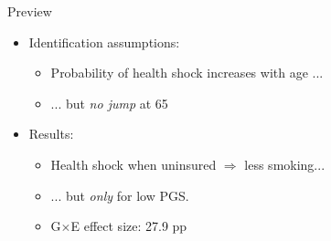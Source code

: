 \documentclass[10pt,compress,xcolor=dvipsnames,aspectratio=169]{beamer}    %
\newcounter{ex}
\newcommand{\1}[1]{\mathrm{1\hspace*{-2.5pt}l}[#1]}	%
\begin{document}
\begin{frame}{Preview}

\begin{itemize}
	\item Identification assumptions:
	\begin{itemize}
		\item Probability of health shock increases with age ...
		\item ... but \emph{no jump} at 65
	\end{itemize}

	\vspace{3ex}

	\item Results:
	\begin{itemize}
		\item Health shock when uninsured $\Rightarrow$ less smoking...
		\item ... but \textit{only} for low PGS.
		\item G$\times$E effect size: 27.9 pp
	\end{itemize}
\end{itemize}

\end{frame}

\end{document}
